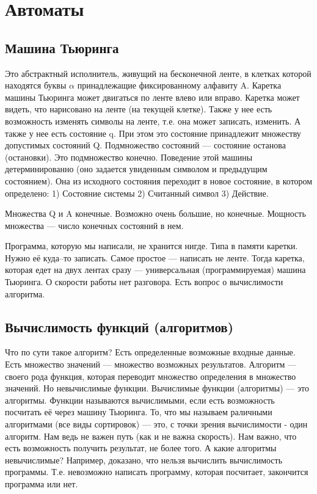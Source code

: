 \chapter{Автоматы}
\section{Машина Тьюринга}
Это абстрактный исполнитель, живущий на бесконечной ленте, в клетках которой находятся буквы $\alpha$ принадлежащие фиксированному алфавиту A. Каретка машины Тьюринга может двигаться по ленте влево или вправо. Каретка может видеть, что нарисовано на ленте (на текущей клетке). Также у нее есть возможность изменять символы на ленте, т.е. она может записать, изменить. А также у нее есть состояние q. При этом это состояние принадлежит множеству допустимых состояний Q. Подмножество состояний --- состояние останова (остановки). Это подмножество конечно. Поведение этой машины детерминированно (оно задается увиденным символом и предыдущим состоянием). Она из исходного состояния переходит в новое состояние, в котором определено: 1) Состояние системы 2) Считанный символ 3) Действие.

Множества Q и A конечные. Возможно очень большие, но конечные. Мощность множества --- число конечных состояний в нем.

Программа, которую мы написали, не хранится нигде. Типа в памяти каретки. Нужно её куда--то записать. Самое простое --- написать не ленте. Тогда каретка, которая едет на двух лентах сразу --- универсальная (программируемая) машина Тьюринга. О скорости работы нет разговора. Есть вопрос о вычислимости алгоритма.
\section{Вычислимость функций (алгоритмов)}
Что по сути такое алгоритм? Есть определенные возможные входные данные. Есть множество значений --- множество возможных результатов. Алгоритм --- своего рода функция, которая переводит множество определения в множество значений. Но невычислимые функции. Вычислимые функции (алгоритмы) --- это алгоритмы. Функции называются вычислимыми, если есть возможность посчитать её через машину Тьюринга. То, что мы называем раличными алгоритмами (все виды сортировок) --- это, с точки зрения вычислимости - один алгоритм. Нам ведь не важен путь (как и не важна скорость). Нам важно, что есть возможность получить результат, не более того. А какие алгоритмы невычислимые? Например, доказано, что нельзя вычислить вычислимость программы. Т.е. невозможно написать программу, которая посчитает, закончится программа или нет.

